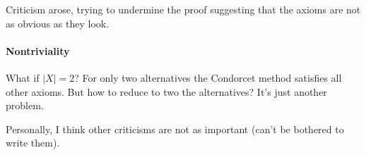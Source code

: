 Criticism arose, trying to undermine the proof suggesting that the axioms are not as obvious as they look.

\paragraph{Nontriviality} What if $|X| = 2$? For only two alternatives the Condorcet method satisfies all other axioms. But how to reduce to two the alternatives? It's just another problem.

Personally, I think other criticisms are not as important (can't be bothered to write them).


